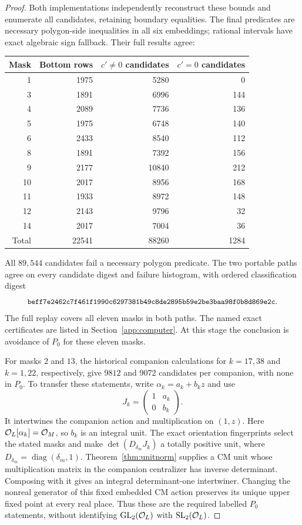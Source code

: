\begin{proof}
Both implementations independently reconstruct these bounds and enumerate
all candidates, retaining boundary equalities. The final predicates are
necessary polygon-side inequalities in all six embeddings; rational
intervals have exact algebraic sign fallback. Their full results agree:
\begin{center}
\begin{tabular}{rrrr}
\toprule
Mask & Bottom rows & $c'\ne0$ candidates & $c'=0$ candidates\\
\midrule
1 & 1975 & 5280 & 0\\
3 & 1891 & 6996 & 144\\
4 & 2089 & 7736 & 136\\
5 & 1975 & 6748 & 140\\
6 & 2433 & 8540 & 112\\
8 & 1891 & 7392 & 156\\
9 & 2177 & 10840 & 212\\
10 & 2017 & 8956 & 168\\
11 & 1933 & 8972 & 148\\
12 & 2143 & 9796 & 32\\
14 & 2017 & 7004 & 36\\
\midrule
Total & 22541 & 88260 & 1284\\
\bottomrule
\end{tabular}
\end{center}
All $89{,}544$ candidates fail a necessary polygon predicate. The two
portable paths agree on every candidate digest and failure histogram,
with ordered classification digest
\[
 \digest{beff7e2462c7f461f1990c6297381b4}{9c8de2895b59e2be3baa98f0b8d869e2c}.
\]
The full replay covers all eleven masks in both paths. The named exact
certificates are listed in Section~\ref{app:computer}. At this stage
the conclusion is avoidance of $P_0$ for these eleven masks.

For masks $2$ and $13$, the historical companion calculations for
$k=17,38$ and $k=1,22$, respectively, give $9812$ and $9072$
candidates per companion, with none in $P_0$. To transfer these
statements, write $\alpha_k=a_k+b_kz$ and use
\[
 J_k=\begin{pmatrix}1&a_k\\0&b_k\end{pmatrix}.
\]
It intertwines the companion action and multiplication on $(1,z)$.
Here $\mathcal O_L[\alpha_k]=\mathcal O_M$, so $b_k$ is an integral unit.
The exact orientation fingerprints select the stated masks and make
$\det(D_{\delta_m}J_k)$ a totally positive unit, where
$D_{\delta_m}=\operatorname{diag}(\delta_m,1)$.
Theorem~\ref{thm:unitnorm} supplies a CM unit whose multiplication
matrix in the companion centralizer has inverse determinant.
Composing with it gives an integral determinant-one intertwiner.
Changing the nonreal generator of this fixed embedded CM action
preserves its unique upper fixed point at every real place.
Thus these are the required labelled $P_0$ statements, without
identifying $\operatorname{GL}_2(\mathcal O_L)$ with $\operatorname{SL}_2(\mathcal O_L)$.


\end{proof}

